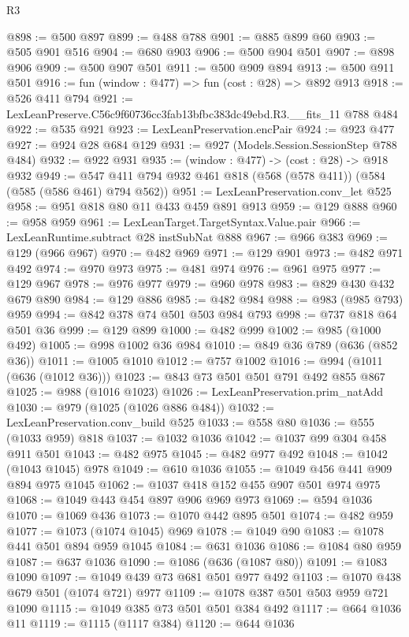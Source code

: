 \begin{lexlean}{R3}
\begin{coremodule}
@898 := @500 @897
@899 := @488 @788
@901 := @885 @899 @60
@903 := @505 @901 @516
@904 := @680 @903
@906 := @500 @904 @501
@907 := @898 @906
@909 := @500 @907 @501
@911 := @500 @909 @894
@913 := @500 @911 @501
@916 := fun (window : @477) => fun (cost : @28) => @892 @913
@918 := @526 @411 @794
@921 := LexLeanPreserve.C56c9f60736cc3fab13bfbc383dc49ebd.R3.__fits_11 @788 @484
@922 := @535 @921
@923 := LexLeanPreservation.encPair
@924 := @923 @477
@927 := @924 @28 @684 @129
@931 := @927 (Models.Session.SessionStep @788 @484)
@932 := @922 @931
@935 := (window : @477) -> (cost : @28) -> @918 @932
@949 := @547 @411 @794 @932 @461 @818 (@568 (@578 @411)) (@584 (@585 (@586 @461) @794 @562))
@951 := LexLeanPreservation.conv_let @525
@958 := @951 @818 @80 @11 @433 @459 @891 @913
@959 := @129 @888
@960 := @958 @959
@961 := LexLeanTarget.TargetSyntax.Value.pair
@966 := LexLeanRuntime.subtract @28 instSubNat @888
@967 := @966 @383
@969 := @129 (@966 @967)
@970 := @482 @969
@971 := @129 @901
@973 := @482 @971 @492
@974 := @970 @973
@975 := @481 @974
@976 := @961 @975
@977 := @129 @967
@978 := @976 @977
@979 := @960 @978
@983 := @829 @430 @432 @679 @890
@984 := @129 @886
@985 := @482 @984
@988 := @983 (@985 @793) @959
@994 := @842 @378 @74 @501 @503 @984 @793
@998 := @737 @818 @64 @501 @36
@999 := @129 @899
@1000 := @482 @999
@1002 := @985 (@1000 @492)
@1005 := @998 @1002 @36 @984
@1010 := @849 @36 @789 (@636 (@852 @36))
@1011 := @1005 @1010
@1012 := @757 @1002
@1016 := @994 (@1011 (@636 (@1012 @36)))
@1023 := @843 @73 @501 @501 @791 @492 @855 @867
@1025 := @988 (@1016 @1023)
@1026 := LexLeanPreservation.prim_natAdd
@1030 := @979 (@1025 (@1026 @886 @484))
@1032 := LexLeanPreservation.conv_build @525
@1033 := @558 @80
@1036 := @555 (@1033 @959) @818
@1037 := @1032 @1036
@1042 := @1037 @99 @304 @458 @911 @501
@1043 := @482 @975
@1045 := @482 @977 @492
@1048 := @1042 (@1043 @1045) @978
@1049 := @610 @1036
@1055 := @1049 @456 @441 @909 @894 @975 @1045
@1062 := @1037 @418 @152 @455 @907 @501 @974 @975
@1068 := @1049 @443 @454 @897 @906 @969 @973
@1069 := @594 @1036
@1070 := @1069 @436
@1073 := @1070 @442 @895 @501
@1074 := @482 @959
@1077 := @1073 (@1074 @1045) @969
@1078 := @1049 @90
@1083 := @1078 @441 @501 @894 @959 @1045
@1084 := @631 @1036
@1086 := @1084 @80 @959
@1087 := @637 @1036
@1090 := @1086 (@636 (@1087 @80))
@1091 := @1083 @1090
@1097 := @1049 @439 @73 @681 @501 @977 @492
@1103 := @1070 @438 @679 @501 (@1074 @721) @977
@1109 := @1078 @387 @501 @503 @959 @721 @1090
@1115 := @1049 @385 @73 @501 @501 @384 @492
@1117 := @664 @1036 @11
@1119 := @1115 (@1117 @384)
@1120 := @644 @1036

\end{coremodule}
\end{lexlean}

